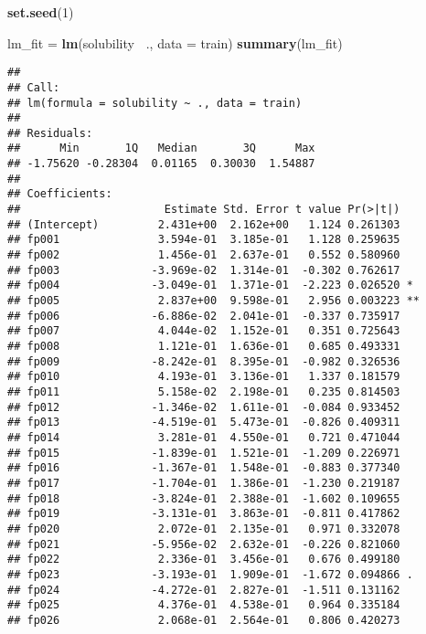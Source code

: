 \documentclass[
]{article}
\newenvironment{Shaded}{\begin{snugshade}}{\end{snugshade}}
\newcommand{\DataTypeTok}[1]{\textcolor[rgb]{0.13,0.29,0.53}{#1}}
\newcommand{\DecValTok}[1]{\textcolor[rgb]{0.00,0.00,0.81}{#1}}
\newcommand{\KeywordTok}[1]{\textcolor[rgb]{0.13,0.29,0.53}{\textbf{#1}}}
\newcommand{\NormalTok}[1]{#1}
\newcommand{\OperatorTok}[1]{\textcolor[rgb]{0.81,0.36,0.00}{\textbf{#1}}}
\newcommand{\StringTok}[1]{\textcolor[rgb]{0.31,0.60,0.02}{#1}}
\begin{document}
\begin{Shaded}
\begin{Highlighting}[]
\KeywordTok{set.seed}\NormalTok{(}\DecValTok{1}\NormalTok{)}

\NormalTok{lm_fit =}\StringTok{ }\KeywordTok{lm}\NormalTok{(solubility }\OperatorTok{~}\NormalTok{., }\DataTypeTok{data =}\NormalTok{ train)}
\KeywordTok{summary}\NormalTok{(lm_fit)}
\end{Highlighting}
\end{Shaded}

\begin{verbatim}
## 
## Call:
## lm(formula = solubility ~ ., data = train)
## 
## Residuals:
##      Min       1Q   Median       3Q      Max 
## -1.75620 -0.28304  0.01165  0.30030  1.54887 
## 
## Coefficients:
##                      Estimate Std. Error t value Pr(>|t|)    
## (Intercept)         2.431e+00  2.162e+00   1.124 0.261303    
## fp001               3.594e-01  3.185e-01   1.128 0.259635    
## fp002               1.456e-01  2.637e-01   0.552 0.580960    
## fp003              -3.969e-02  1.314e-01  -0.302 0.762617    
## fp004              -3.049e-01  1.371e-01  -2.223 0.026520 *  
## fp005               2.837e+00  9.598e-01   2.956 0.003223 ** 
## fp006              -6.886e-02  2.041e-01  -0.337 0.735917    
## fp007               4.044e-02  1.152e-01   0.351 0.725643    
## fp008               1.121e-01  1.636e-01   0.685 0.493331    
## fp009              -8.242e-01  8.395e-01  -0.982 0.326536    
## fp010               4.193e-01  3.136e-01   1.337 0.181579    
## fp011               5.158e-02  2.198e-01   0.235 0.814503    
## fp012              -1.346e-02  1.611e-01  -0.084 0.933452    
## fp013              -4.519e-01  5.473e-01  -0.826 0.409311    
## fp014               3.281e-01  4.550e-01   0.721 0.471044    
## fp015              -1.839e-01  1.521e-01  -1.209 0.226971    
## fp016              -1.367e-01  1.548e-01  -0.883 0.377340    
## fp017              -1.704e-01  1.386e-01  -1.230 0.219187    
## fp018              -3.824e-01  2.388e-01  -1.602 0.109655    
## fp019              -3.131e-01  3.863e-01  -0.811 0.417862    
## fp020               2.072e-01  2.135e-01   0.971 0.332078    
## fp021              -5.956e-02  2.632e-01  -0.226 0.821060    
## fp022               2.336e-01  3.456e-01   0.676 0.499180    
## fp023              -3.193e-01  1.909e-01  -1.672 0.094866 .  
## fp024              -4.272e-01  2.827e-01  -1.511 0.131162    
## fp025               4.376e-01  4.538e-01   0.964 0.335184    
## fp026               2.068e-01  2.564e-01   0.806 0.420273    

\end{verbatim}
\end{document}
